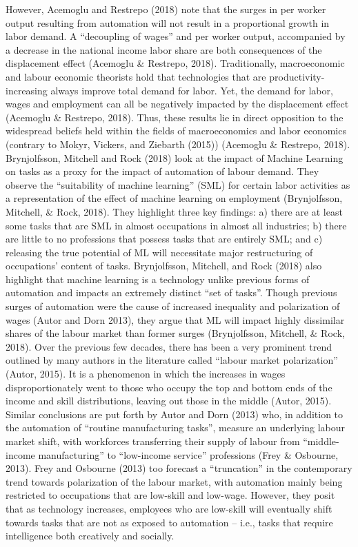 \documentclass[12pt]{article}
\begin{document}
\begin{flushleft}
\break
\linebreak
However, Acemoglu and Restrepo (2018) note that the surges in per worker output resulting from automation will not result in a proportional growth in labor demand. A “decoupling of wages” and per worker output, accompanied by a decrease in the national income labor share are both consequences of the displacement effect (Acemoglu \& Restrepo, 2018). Traditionally, macroeconomic and labour economic theorists hold that technologies that are productivity-increasing always improve total demand for labor. Yet, the demand for labor, wages and employment can all be negatively impacted by the displacement effect (Acemoglu \& Restrepo, 2018). Thus, these results lie in direct opposition to the widespread beliefs held within the fields of macroeconomics and labor economics (contrary to Mokyr, Vickers, and Ziebarth (2015)) (Acemoglu \& Restrepo, 2018). 
\break
\linebreak
Brynjolfsson, Mitchell and Rock (2018) look at the impact of Machine Learning on tasks as a proxy for the impact of automation of labour demand. They observe the ``suitability of machine learning” (SML) for certain labor activities as a representation of the effect of machine learning on employment (Brynjolfsson, Mitchell, \& Rock, 2018). They highlight three key findings: a) there are at least some tasks that are SML in almost occupations in almost all industries; b) there are little to no professions that possess tasks that are entirely SML; and c) releasing the true potential of ML will necessitate major restructuring of occupations’ content of tasks. Brynjolfsson, Mitchell, and Rock (2018) also highlight that machine learning is a technology unlike previous forms of automation and impacts an extremely distinct ``set of tasks”. Though previous surges of automation were the cause of increased inequality and polarization of wages (Autor and Dorn 2013), they argue that ML will impact highly dissimilar shares of the labour market than former surges (Brynjolfsson, Mitchell, \& Rock, 2018). 
\break
\linebreak
Over the previous few decades, there has been a very prominent trend outlined by many authors in the literature called ``labour market polarization” (Autor, 2015). It is a phenomenon in which the increases in wages disproportionately went to those who occupy the top and bottom ends of the income and skill distributions, leaving out those in the middle (Autor, 2015). Similar conclusions are put forth by Autor and Dorn (2013) who, in addition to the automation of ``routine manufacturing tasks”, measure an underlying labour market shift, with workforces transferring their supply of labour from ``middle-income manufacturing” to ``low-income service” professions (Frey \& Osbourne, 2013). Frey and Osbourne (2013) too forecast a ``truncation” in the contemporary trend towards polarization of the labour market, with automation mainly being restricted to occupations that are low-skill and low-wage. However, they posit that as technology increases, employees who are low-skill will eventually shift towards tasks that are not as exposed to automation – i.e., tasks that require intelligence both creatively and socially.

\end{flushleft}
\end{document}
